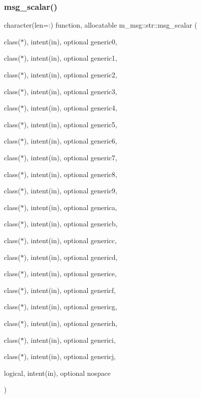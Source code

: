 \subsubsection{\texorpdfstring{msg\+\_\+scalar()}{msg\_scalar()}}
{\footnotesize\ttfamily character(len=\+:) function, allocatable m\+\_\+msg\+::str\+::msg\+\_\+scalar (\begin{DoxyParamCaption}\item[{class($\ast$), intent(in), optional}]{generic0,  }\item[{class($\ast$), intent(in), optional}]{generic1,  }\item[{class($\ast$), intent(in), optional}]{generic2,  }\item[{class($\ast$), intent(in), optional}]{generic3,  }\item[{class($\ast$), intent(in), optional}]{generic4,  }\item[{class($\ast$), intent(in), optional}]{generic5,  }\item[{class($\ast$), intent(in), optional}]{generic6,  }\item[{class($\ast$), intent(in), optional}]{generic7,  }\item[{class($\ast$), intent(in), optional}]{generic8,  }\item[{class($\ast$), intent(in), optional}]{generic9,  }\item[{class($\ast$), intent(in), optional}]{generica,  }\item[{class($\ast$), intent(in), optional}]{genericb,  }\item[{class($\ast$), intent(in), optional}]{genericc,  }\item[{class($\ast$), intent(in), optional}]{genericd,  }\item[{class($\ast$), intent(in), optional}]{generice,  }\item[{class($\ast$), intent(in), optional}]{genericf,  }\item[{class($\ast$), intent(in), optional}]{genericg,  }\item[{class($\ast$), intent(in), optional}]{generich,  }\item[{class($\ast$), intent(in), optional}]{generici,  }\item[{class($\ast$), intent(in), optional}]{genericj,  }\item[{logical, intent(in), optional}]{nospace }\end{DoxyParamCaption})\hspace{0.3cm}{\ttfamily [private]}}



